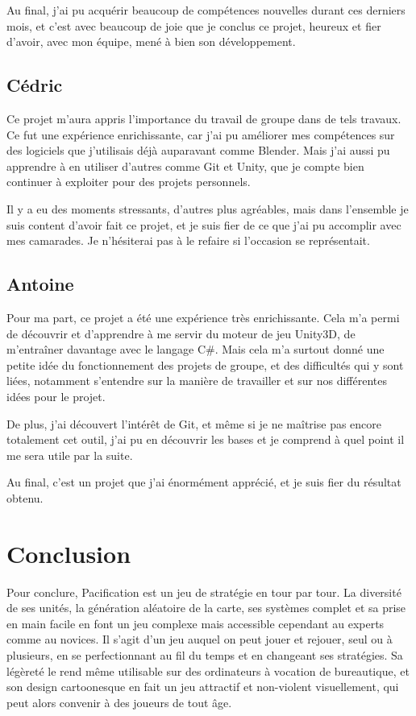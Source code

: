 \documentclass[12pt]{report}
\begin{document}
Au final, j’ai pu acquérir beaucoup de compétences nouvelles durant ces derniers
 mois, et c’est avec beaucoup de joie que je conclus ce projet, heureux et fier
 d’avoir, avec mon équipe, mené à bien son développement.

\section{Cédric}

Ce projet m’aura appris l’importance du travail de groupe dans de tels travaux. 
Ce fut une expérience enrichissante, car j’ai pu améliorer mes compétences sur 
des logiciels que j’utilisais déjà auparavant comme Blender. Mais j’ai aussi pu 
apprendre à en utiliser d’autres comme Git et Unity, que je compte bien 
continuer à exploiter pour des projets personnels.

Il y a eu des moments stressants, d’autres plus agréables, mais dans l’ensemble 
je suis content d’avoir fait ce projet, et je suis fier de ce que j’ai pu accomplir
 avec mes camarades. Je n’hésiterai pas à le refaire si l’occasion se représentait. 

\section{Antoine}

Pour ma part, ce projet a été une expérience très enrichissante. Cela m’a permi 
de découvrir et d’apprendre à me servir du moteur de jeu Unity3D, de m'entraîner 
davantage avec le langage C\#. Mais cela m’a surtout donné une petite idée du 
fonctionnement des projets de groupe, et des difficultés qui y sont liées,
 notamment s’entendre sur la manière de travailler et sur nos différentes idées 
pour le projet. 

De plus, j’ai découvert l'intérêt de Git, et même si je ne maîtrise pas encore 
totalement cet outil, j’ai pu en découvrir les bases et je comprend à quel point il 
me sera utile par la suite. 

Au final, c’est un projet que j’ai énormément apprécié, et je suis fier du résultat 
obtenu.

\chapter{Conclusion}

Pour conclure, Pacification est un jeu de stratégie en tour par tour. La diversité 
de ses unités, la génération aléatoire de la carte, ses systèmes complet et sa prise
 en main facile en font un jeu complexe mais accessible cependant au experts
 comme au novices. Il s’agit d’un jeu auquel on peut jouer et rejouer, seul ou à
 plusieurs, en se perfectionnant au fil du temps et en changeant ses stratégies. 
Sa légèreté le rend même utilisable sur des ordinateurs à vocation de bureautique, 
et son design cartoonesque en fait un jeu attractif et non-violent visuellement,
 qui peut alors convenir à des joueurs de tout âge.
\end{document}
